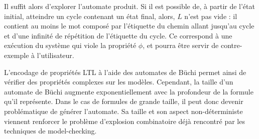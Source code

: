 Il suffit alors d'explorer l'automate produit. Si il est possible de, à partir
de l'état initial, atteindre un cycle contenant un état final, alors, \(L\)
n'est pas vide : il contient au moins le mot composé par l'étiquette du chemin
allant jusqu'au cycle et d'une infinité de répétition de l'étiquette du cycle.
Ce correspond à une exécution du système qui viole la propriété \(\phi\), et
pourra être servir de contre-exemple à l'utilisateur.

L'encodage de propriétés LTL à l'aide des automates de Büchi permet ainsi de
vérifier des propriétés complexes sur les modèles. Cependant, la taille d'un
automate de Büchi augmente exponentiellement avec la profondeur de la formule
qu'il représente. Dans le cas de formules de grande taille, il peut donc devenir
problématique de générer l'automate. Sa taille et son aspect non-déterministe
viennent renforcer le problème d'explosion combinatoire déjà rencontré par les
techniques de model-checking.
